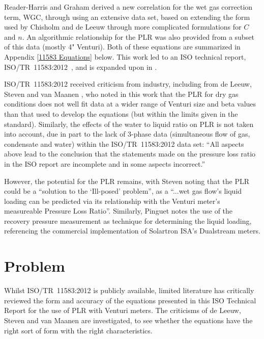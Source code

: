 \documentclass[journal]{IEEEtran}
\begin{document}
Reader-Harris and Graham \cite{Reader-Harris2009} derived a new correlation for the wet gas correction term, \acrshort{WGC}, through using an extensive data set, based on extending the form used by Chisholm \cite{Chisholm1977} and de Leeuw \cite{DeLeeuw1997} through more complicated formulations for $C$ and $n$.  An algorithmic relationship for the \acrshort{PLR} was also provided from a subset of this data (mostly 4" Venturi).  Both of these equations are summarized in Appendix \ref{11583 Equations} below. This work led to an ISO technical report, ISO/TR~11583:2012~\cite{2003ISOTubes}, and is expanded upon in \cite{Reader-Harris2015}.  

ISO/TR~11583:2012 received criticism from industry, including from de Leeuw, Steven and van Maanen \cite{DeLeeuw2011}, who noted in this work that the \acrlong{PLR} for dry gas conditions does not well fit data at a wider range of Venturi size and \acrshort{beta} values than that used to develop the equations (but within the limits given in the standard).  Similarly, the effects of the water to liquid ratio on  \acrshort{PLR} is not taken into account, due in part to the lack of 3-phase data (simultaneous flow of gas, condensate and water) within the ISO/TR~11583:2012 data set: ``All aspects above lead to the conclusion that the statements made on the pressure loss ratio in the ISO report are incomplete and in some aspects incorrect.'' 

However, the potential for the \acrlong{PLR} remains, with Steven \cite{Steven2018OrificeProblem} noting that the \acrshort{PLR} could be a ``solution to the `Ill-posed' problem'', as a ``...wet gas flow’s liquid loading can be predicted via its relationship with the Venturi meter’s measureable Pressure Loss Ratio''.  Similarly, Pinguet \cite{Pinguet2018ExtensiveConditions} notes the use of the recovery pressure measurement as technique for determining the liquid loading, referencing the commercial implementation of Solartron ISA's Dualstream meters.

\section{Problem}

Whilst ISO/TR~11583:2012 is publicly available, limited literature has critically reviewed the form and accuracy of the equations presented in this ISO Technical Report for the use of \acrlong{PLR} with Venturi meters.  The criticisms of de Leeuw, Steven and van Maanen \cite{DeLeeuw2011} are investigated, to see whether the equations have the right sort of form with the right characteristics.
\end{document}
